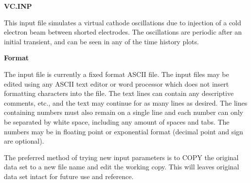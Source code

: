 \begin{section}
\begin{subsection}
\begin{subsubsection}
{\bf VC.INP}

      This input file simulates a virtual cathode oscillations due to
injection of a cold electron beam between shorted electrodes.  The
oscillations are periodic after an initial transient, and can be seen
in any of the time history plots.
\end{subsubsection}
\end{subsection}

\begin{subsection}
{\bf Format}

   The input file is currently a fixed format ASCII file.  The input
files may be edited using any ASCII text editor or word processor
which does not insert formatting characters into the file.  The text
lines can contain any descriptive comments, etc., and the text may
continue for as many lines as desired.  The lines containing numbers
must also remain on a single line and each number can only be
separated by white space, including any amount of spaces and tabs.
The numbers may be in floating point or exponential format (decimal
point and sign are optional).

   The preferred method of trying new input parameters is to COPY the
original data set to a new file name and edit the working copy.  This
will leaves original data set intact for future use and reference.

\end{subsection}
\end{section}

